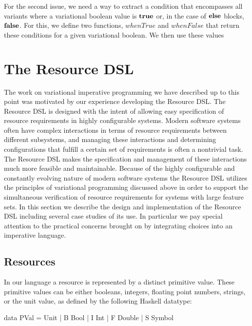 \documentclass[12pt,oneside]{book}
\begin{document}
For the second issue, we need a way to extract a condition that encompasses all variants where a variational boolean value is $\textbf{\textup{\textrm{true}}}$ or, in the case of $\textbf{\textup{\textrm{else}}}$ blocks,
$\textbf{\textup{\textrm{false}}}$. For this, we define two functions, $\mathit{whenTrue}$ and $\mathit{whenFalse}$ that return these conditions for a given variational boolean. We then use these
values 

\chapter{The Resource DSL}
\label{ch:rdsl}

The work on variational imperative programming we have described up to this point was motivated
by our experience developing the Resource DSL. The Resource DSL is designed with the intent of
allowing easy specification of resource requirements in highly configurable systems. Modern software
systems often have complex interactions in terms of resource requirements between different subsystems,
and managing these interactions and determining configurations that fulfill a certain set of requirements
is often a nontrivial task. The Resource DSL makes the specification and management
of these interactions much more feasible and maintainable. Because of the highly configurable and constantly evolving
nature of modern software systems the Resource DSL utilizes the principles of variational programming
discussed above in order to support the simultaneous verification of resource requirements for
systems with large feature sets. In this section we describe the design and implementation of the
Resource DSL including several case studies of its use. In particular we pay special attention to the
practical concerns brought on by integrating choices into an imperative language.

\section{Resources}

In our language a resource is represented by a distinct primitive value. These primitive values
can be either booleans, integers, floating point numbers, strings, or the unit value, as defined
by the following Haskell datatype:

\begin{program}
data PVal
     = Unit
     | B Bool
     | I Int
     | F Double
     | S Symbol
\end{program}
\end{document}
